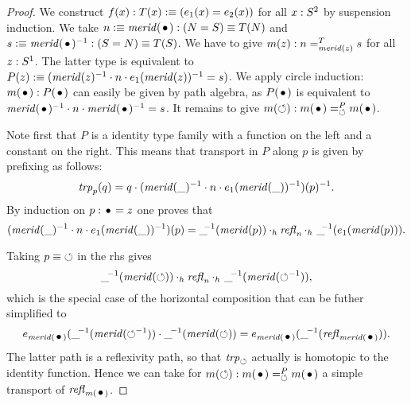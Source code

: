 \documentclass[english,a4]{article}
\begin{document}
\begin{proof}
We construct $f(x):T(x)\mathrel{\hbox{:}\mkern-5mu\equiv}(e_1(x)=e_2(x))$ for all $x:S^2$ by 
suspension induction. We take $n\defeq\mrd(\base):(N=S)\jdeq T(N)$ and 
$s\defeq\mrd(\base)^{-1}:(S=N)\jdeq T(S)$. 
We have to give $m(z): n=^T_{\mathit{merid}(z)}s$
for all $z:{S^1}$. The latter type is equivalent to
$P(z)\mathrel{\hbox{:}\mkern-5mu\equiv}(\mathit{merid}(z)^{-1}\cdot n\cdot e_1(\mathit{merid}(z))^{-1} = s)$.
We apply circle induction:
$m(\base): P(\base)$ can easily be given by path algebra,
as $P(\base)$ is equivalent to 
$\mrd(\base)^{-1}\cdot n\cdot\mrd(\base)^{-1} = s$.
It remains to give $m(\Sloop): m(\base)=^P_{\Sloop}m(\base)$.

Note first that $P$ is a identity type family with a function on the left
and a constant on the right. This means that transport in $P$ along $p$
is given by prefixing as follows:
\[
\mathop{\mathit{trp}_{p}}(q) = q \cdot (\mathit{merid}(\_)^{-1}\cdot n \cdot e_1(\mathit{merid}(\_))^{-1})(p)^{-1}.
\]
By induction on $p:\base=z$ one proves that
\[
(\mathit{merid}(\_)^{-1}\cdot n \cdot e_1(\mathit{merid}(\_))^{-1})(p) = 
\_\!\!^{-1}(\mathit{merid}(p)) \cdot_h \mathop{{\mathit{refl}}_{n}} \cdot_h\  \_\!\!^{-1}(e_1(\mathit{merid}(p))).
\]
\begin{center}
\end{center}

Taking $p\equiv{\mathord{\circlearrowleft}}$ in the rhs gives
\[
\_\!^{-1}(\mathit{merid}(\mathord{\circlearrowleft})) \cdot_h \mathop{{\mathit{refl}}_{n}} \cdot_h\  \_\!^{-1}(\mathit{merid}(\mathord{\circlearrowleft}^{-1})),
\]
which is the special case of the horizontal composition that can be futher
simplified to
\begin{align}
  \label{eq:trp-for-e1=e2}
e_{\mrd(\base)}(\_\!^{-1}(\mrd(\Sloop^{-1})) \cdot\_\!^{-1}(\mrd(\Sloop)) = 
e_{\mrd(\base)}(\_\!^{-1}(\refl{\mrd(\base)})).
\end{align}
The latter path is a reflexivity path, so that $\mathop{\mathit{trp}_{\mathord{\circlearrowleft}}}$ actually is
homotopic to the identity function. Hence we can take for 
$m(\Sloop): m(\base)=^P_{\Sloop}m(\base)$ a simple transport of $\refl{m(\base)}$.


\end{proof}
\end{document}
